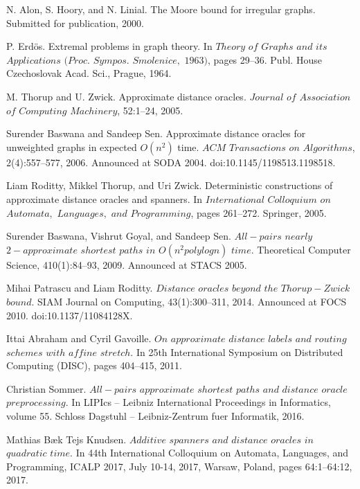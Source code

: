 \documentclass[shortabstract, lic, english]{iithesis}
\theoremstyle{definition} \newtheorem{definition}{Definition}[chapter]
\theoremstyle{remark} \newtheorem{remark}[definition]{Observation}
\theoremstyle{plain} \newtheorem{theorem}[definition]{Theorem}
\theoremstyle{plain} \newtheorem{lemma}[definition]{Lemma}
\theoremstyle{plain} \newtheorem{conjecture}[definition]{Conjecture}
\begin{document}

\begin{thebibliography}{1}
N. Alon, S. Hoory, and N. Linial. The Moore bound for irregular
graphs. Submitted for publication, 2000.

P. Erd{\"o}s. Extremal problems in graph theory. In $Theory$ $of$ $Graphs$
$and$ $its$ $Applications$ $(Proc.$ $Sympos.$ $Smolenice,$ $1963)$, pages 29–36.
Publ. House Czechoslovak Acad. Sci., Prague, 1964.

M. Thorup and U. Zwick. Approximate distance oracles. $Journal$ $of$ $Association$ $of$ $Computing$
$Machinery$, 52:1–24, 2005.

Surender Baswana and Sandeep Sen. Approximate distance oracles for unweighted graphs
in expected $O(n^2)$ time. $ACM$ $Transactions$ $on$ $Algorithms$, 2(4):557–577, 2006. Announced
at SODA 2004. doi:10.1145/1198513.1198518.

Liam Roditty, Mikkel Thorup, and Uri Zwick. Deterministic constructions of approximate
distance oracles and spanners. In $International$ $Colloquium$ $on$ $Automata,$ $Languages,$ $and$
$Programming$, pages 261–272. Springer, 2005.

Surender Baswana, Vishrut Goyal, and Sandeep Sen. $All-pairs$ $nearly$ $2-approximate$ $shortest$ 
$paths$ $in$ $O(n^2poly log n)$ $time.$ Theoretical Computer Science, 410(1):84–93, 2009. Announced at STACS 2005.

Mihai Patrascu and Liam Roditty. $Distance$ $oracles$ $beyond$ $the$ $Thorup-Zwick$ $bound.$
SIAM Journal on Computing, 43(1):300–311, 2014. Announced at FOCS 2010.
doi:10.1137/11084128X.

Ittai Abraham and Cyril Gavoille. $On$ $approximate$ $distance$ $labels$ $and$ $routing$ $schemes$
$with$ $affine$ $stretch.$ In 25th International Symposium on Distributed Computing (DISC),
pages 404–415, 2011.

Christian Sommer. $All-pairs$ $approximate$ $shortest$ $paths$ $and$ $distance$ $oracle$ $preprocessing.$
In LIPIcs – Leibniz International Proceedings in Informatics, volume 55. Schloss Dagstuhl
– Leibniz-Zentrum fuer Informatik, 2016.

Mathias Bæk Tejs Knudsen. $Additive$ $spanners$ $and$ $distance$ $oracles$ $in$ $quadratic$ $time.$
In 44th International Colloquium on Automata, Languages, and Programming, ICALP
2017, July 10-14, 2017, Warsaw, Poland, pages 64:1–64:12, 2017.


\end{thebibliography}
\end{document}
